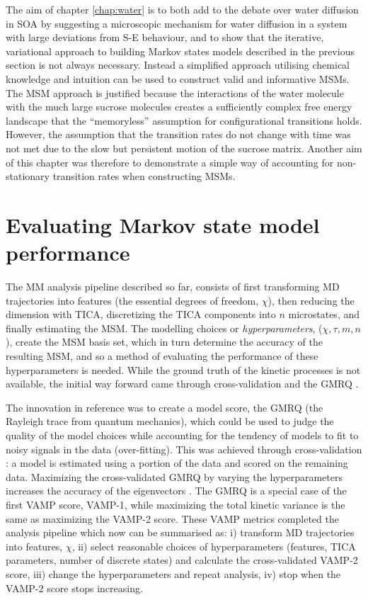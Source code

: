 The aim of chapter \ref{chap:water} is to both add to the debate over water diffusion in SOA by suggesting a microscopic mechanism for water diffusion in a system with large deviations from S-E behaviour, and to show that the iterative,  variational approach to building Markov states models described in the previous section is not always necessary. Instead a simplified approach  utilising chemical knowledge and intuition can be used to construct valid and informative MSMs. The MSM approach is justified because the interactions of the water molecule with the much large sucrose molecules creates a sufficiently complex free energy landscape that the ``memoryless'' assumption for configurational transitions holds.  However, the assumption that the transition rates do not change with time was not met due to the slow but persistent motion of the sucrose matrix. Another aim of this  chapter was therefore to demonstrate a simple way of accounting for non-stationary transition rates when constructing MSMs.  


\section{Evaluating Markov state model performance}\label{sec:intro_msm_perf}
The MM analysis pipeline described so far, consists of first transforming MD trajectories into features (the essential degrees of freedom, $\chi$), then reducing the dimension with TICA,  discretizing the TICA components into $n$ microstates, and finally estimating the MSM. The modelling choices or \emph{hyperparameters}, ($\chi, \tau, m, n$), create the MSM basis set, which in turn determine the accuracy of the resulting MSM, and so a method of evaluating the performance of these hyperparameters  is needed. While the ground truth of the kinetic processes is not available, the initial way forward came through cross-validation and the GMRQ \cite{mcgibbonVariationalCrossvalidationSlow2015}. 

The innovation in reference \cite{mcgibbonVariationalCrossvalidationSlow2015} was to create a model score, the GMRQ (the Rayleigh trace from quantum mechanics), which could be used to judge the quality of the model choices while accounting for the tendency of models to fit to noisy signals in the data (over-fitting). This was achieved through cross-validation \cite{arlotSurveyCrossvalidationProcedures2009}: a model is estimated using a portion of the data and scored on the remaining data. Maximizing the cross-validated GMRQ by varying the hyperparameters increases the accuracy of the eigenvectors \cite{mcgibbonVariationalCrossvalidationSlow2015}. The GMRQ is a special case of the first VAMP score, VAMP-1, while maximizing the total kinetic variance is the same as maximizing the VAMP-2 score. These VAMP metrics completed the analysis pipeline \cite{schererVariationalSelectionFeatures2019} which now can be summarised as: i) transform MD trajectories into features, $\chi$, ii) select reasonable choices of  hyperparameters (features, TICA parameters, number of discrete states) and calculate the cross-validated VAMP-2 score, iii) change the hyperparameters and repeat analysis, iv) stop when the VAMP-2 score stops increasing. 


